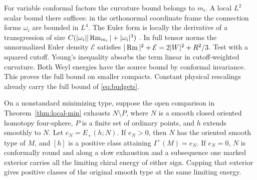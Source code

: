 For variable conformal factors the curvature bound belongs to
\(m_i\). A local \(L^2\) scalar bound there suffices: in the
orthonormal coordinate frame the connection forms \(\omega_i\)
are bounded in \(L^4\). The Euler form is locally the derivative
of a transgression of size
\(C(|\omega_i||\operatorname{Rm}_{m_i}|+|\omega_i|^3)\)
\cite[\S3]{ChernSimons1974Characteristic}. In full tensor norms
the unnormalized Euler density \(\mathcal E\) satisfies
\(|\operatorname{Rm}|^2+\mathcal E=2|W|^2+R^2/3\).
Test with a squared cutoff. Young's inequality absorbs the term
linear in cutoff-weighted curvature. Both Weyl energies have the
source bound by conformal invariance. This proves the full bound
on smaller compacts. Constant physical rescalings already carry
the full bound of \eqref{eq:budgets}.

\begin{corollary}\label{cor:whole-base}
On a nonstandard minimizing type, suppose the open comparison in Theorem~\ref{thm:local-min} exhausts
\(N\setminus P\), where \(N\) is a smooth closed oriented homotopy
four-sphere, \(P\) is a finite set of ordinary points, and \(h\)
extends smoothly to \(N\). Let \(e_N=E_+(h;N)\).
If \(e_N>0\), then \(N\) has the oriented smooth type of \(M\), and
\([h]\) is a positive class attaining \(I^+(M)=e_N\).
If \(e_N=0\), \(N\) is conformally round and along a slow exhaustion
and a subsequence one marked exterior carries all the limiting chiral
energy of either sign. Capping that exterior gives positive classes
of the original smooth type at the same limiting energy.
\end{corollary}

